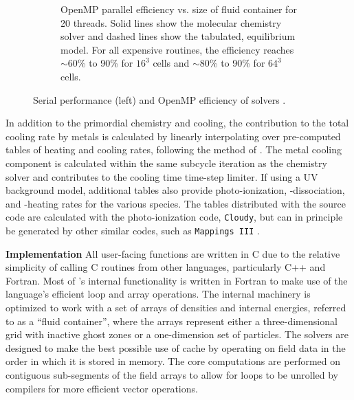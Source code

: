 \begin{figure}[h]
\begin{subfigure}{.42\textwidth}
  \caption{OpenMP parallel efficiency vs. size of fluid container for
    20 threads.  Solid lines show the molecular
    chemistry solver and dashed lines show the tabulated, equilibrium
    model.  For all expensive routines, the efficiency reaches
    $\sim$60\% to 90\% for $16^3$ cells and $\sim$80\% to 90\% for
    $64^3$ cells.}
  \label{fig:openmp}
\end{subfigure}%
\caption{Serial performance (left) and OpenMP efficiency of
   solvers \citep[from][]{2017MNRAS.466.2217S}.}
\label{fig:performance}
\vspace*{-1\baselineskip}
\end{figure}

In addition to the primordial chemistry and cooling, the contribution
to the total cooling rate by metals is calculated by linearly
interpolating over pre-computed tables of heating and cooling rates,
following the method of \citet{2008MNRAS.385.1443S}.
The metal cooling component is calculated within the same subcycle
iteration as the chemistry solver and contributes to the cooling time
time-step limiter.
If using a UV background model,
additional tables also provide photo-ionization, -dissociation, and
-heating rates for the various species.
The tables distributed with the source code are calculated with the
photo-ionization code, \texttt{Cloudy}, but can in principle be
generated by other similar codes, such as \texttt{Mappings III}
\citep{1993ApJS...88..253S}.

\noindent
{\bf Implementation}
All user-facing \grackle{} functions are written in C due
to the relative simplicity of calling C routines from other
languages, particularly C++ and Fortran.  Most of \grackle{}'s
internal functionality is written in Fortran to make use of the
language's efficient loop and array operations.
The internal machinery is optimized to work with a set of arrays of
densities and internal energies, referred to as a ``fluid
container'', where the arrays represent either a three-dimensional
grid with inactive ghost zones or a one-dimension set of particles.
The solvers are designed to make the best possible use of cache by
operating on field data in the order in which it is stored in memory.
The core computations are performed on
contiguous sub-segments of the field arrays to allow for loops to be
unrolled by compilers for more efficient vector operations.

